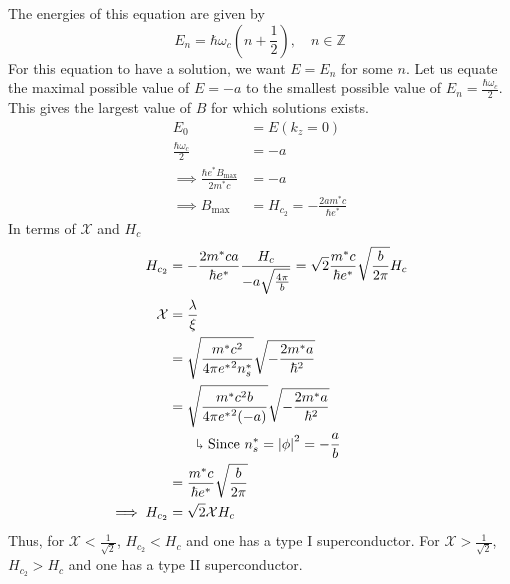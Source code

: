 \documentclass[12pt,a4paper,titlepage]{article}
\newcommand{\trm}[1]{\textrm{#1}} %
\newcommand{\explain}{\quad\rotatebox[origin=c]{180}{$\Lsh$}} %
\newcommand{\Chi}{\mathcal{X}} %
\begin{document}
The energies of this equation are given by
\begin{equation}
E_{n}=\hbar\omega_{c}\left(n+\frac{1}{2}\right),\quad n\in\mathbb{Z}
\end{equation}
For this equation to have a solution, we want $E=E_{n}$ for some $n$. Let us equate the maximal possible value of $E=-a$ to the smallest possible value of $E_{n}=\frac{\hbar\omega_{c}}{2}$. This gives the largest value of $B$ for which solutions exists.
\begin{equation}
\begin{aligned}
E_{0}&=E(k_{z}=0)\\
\frac{\hbar\omega_{c}}{2}&=-a\\
\implies\frac{\hbar e^{*}B_{\trm{max}}}{2m^{*}c}&=-a\\
\implies B_{\trm{max}}&=H_{c_{2}}=-\frac{2am^{*}c}{\hbar e^{*}}
\end{aligned}
\end{equation}
In terms of $\Chi$ and $H_{c}$
\begin{equation}
\begin{aligned}
H_{c_{2}}&=-\frac{2m^{*}ca}{\hbar e^{*}}\frac{H_{c}}{-a\sqrt{\frac{4\pi}{b}}}=\sqrt{2}\frac{m^{*}c}{\hbar e^{*}}\sqrt{\frac{b}{2\pi}}H_{c}\\
\Chi&=\frac{\lambda}{\xi}\\
&=\sqrt{\frac{m^{*}c^{2}}{4\pi{e^{*}}^{2}n_{s}^{*}}}\sqrt{-\frac{2m^{*}a}{\hbar^{2}}}\\
&=\sqrt{\frac{m^{*}c^{2}b}{4\pi{e^{*}}^{2}(-a)}}\sqrt{-\frac{2m^{*}a}{\hbar^{2}}}\\
&\quad\explain\trm{ Since $n_{s}^{*}=\abs{\phi}^{2}=-\frac{a}{b}$}\\
&=\frac{m^{*}c}{\hbar e^{*}}\sqrt{\frac{b}{2\pi}}\\
\implies H_{c_{2}}&=\sqrt{2}\Chi H_{c}
\end{aligned}
\end{equation}
Thus, for $\Chi<\frac{1}{\sqrt{2}}$, $H_{c_{2}}<H_{c}$ and one has a type I superconductor. For $\Chi>\frac{1}{\sqrt{2}}$, $H_{c_{2}}>H_{c}$ and one has a type II superconductor.
\end{document}
